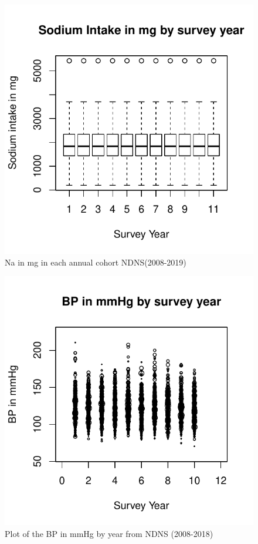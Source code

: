 \documentclass[
]{article}
\begin{document}
\begin{figure}
\centering
\includegraphics{nextlevel_files/figure-latex/fig-Na-and-survey-year-1.pdf}
\caption{Na in mg in each annual cohort NDNS(2008-2019)}
\end{figure}

\begin{figure}
\centering
\includegraphics{nextlevel_files/figure-latex/fig-BP-and-survey-year-1.pdf}
\caption{Plot of the BP in mmHg by year from NDNS (2008-2018)}
\end{figure}
\end{document}

